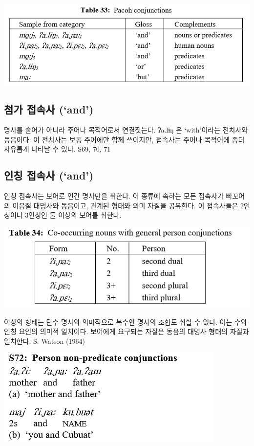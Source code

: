 \includegraphics{Pacoh/src/PacohTable33.png}

\subsection{첨가 접속사 (`and')}
명사를 술어가 아니라 주어나 목적어로서 연결짓는다. ʔa.lɨŋ 은 `with'이라는 전치사와 동음이다. 이 전치사는 보통 주어에만 함께 쓰이지만, 접속사는 주어나 목적어에 좀더 자유롭게 나타날 수 있다.
S69, 70, 71 \omission

\subsection{인칭 접속사 (`and')}
인칭 접속사는 보어로 인간 명사만을 취한다. 이 종류에 속하는 모든 접속사가 빠꼬어의 이음절 대명사와 동음이고, 관계된 형태와 의미 자질을 공유한다.
이 접속사들은 2인칭이나 3인칭인 둘 이상의 보어를 취한다.

\includegraphics{Pacoh/src/PacohTable34.png}

이상의 형태는 단수 명사와 의미적으로 복수인 명사의 조합도 취할 수 있다. 이는 수와 인칭 요인의 의미적 일치이다. 보어에게 요구되는 자질은 동음의 대명사 형태의 자질과 일치한다. S. Watson (1964)

\includegraphics{Pacoh/src/PacohS72.png}

